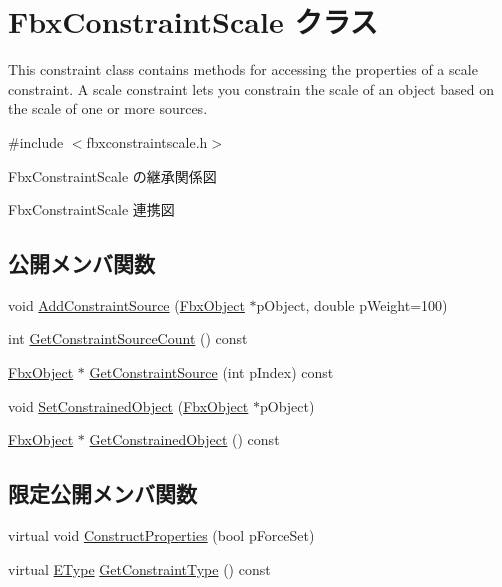 \hypertarget{class_fbx_constraint_scale}{}\section{Fbx\+Constraint\+Scale クラス}
\label{class_fbx_constraint_scale}


This constraint class contains methods for accessing the properties of a scale constraint. A scale constraint lets you constrain the scale of an object based on the scale of one or more sources.  




{\ttfamily \#include $<$fbxconstraintscale.\+h$>$}



Fbx\+Constraint\+Scale の継承関係図


Fbx\+Constraint\+Scale 連携図
\subsection*{公開メンバ関数}
\begin{DoxyCompactItemize}
\item 
void \hyperlink{class_fbx_constraint_scale_a876e788ab98cf2fe1042ae3c687b3689}{Add\+Constraint\+Source} (\hyperlink{class_fbx_object}{Fbx\+Object} $\ast$p\+Object, double p\+Weight=100)
\item 
int \hyperlink{class_fbx_constraint_scale_a5c4500706618751078dddca3652ce936}{Get\+Constraint\+Source\+Count} () const
\item 
\hyperlink{class_fbx_object}{Fbx\+Object} $\ast$ \hyperlink{class_fbx_constraint_scale_ac957fc33cab352ef355602fb4325c5b7}{Get\+Constraint\+Source} (int p\+Index) const
\item 
void \hyperlink{class_fbx_constraint_scale_adf626a9273449dd4c74cf24f2a7bf5af}{Set\+Constrained\+Object} (\hyperlink{class_fbx_object}{Fbx\+Object} $\ast$p\+Object)
\item 
\hyperlink{class_fbx_object}{Fbx\+Object} $\ast$ \hyperlink{class_fbx_constraint_scale_a1dcbdc6b41d04d6a75ca47f024e05dc9}{Get\+Constrained\+Object} () const
\end{DoxyCompactItemize}
\subsection*{限定公開メンバ関数}
\begin{DoxyCompactItemize}
\item 
virtual void \hyperlink{class_fbx_constraint_scale_af34ea4ce8516d69aefbcb9e83060b2c1}{Construct\+Properties} (bool p\+Force\+Set)
\item 
virtual \hyperlink{class_fbx_constraint_a49c1634663395eab7c28856df233ec66}{E\+Type} \hyperlink{class_fbx_constraint_scale_a7eb92c352d4a4bd3c0754dd4e53fa6e4}{Get\+Constraint\+Type} () const
\end{DoxyCompactItemize}
